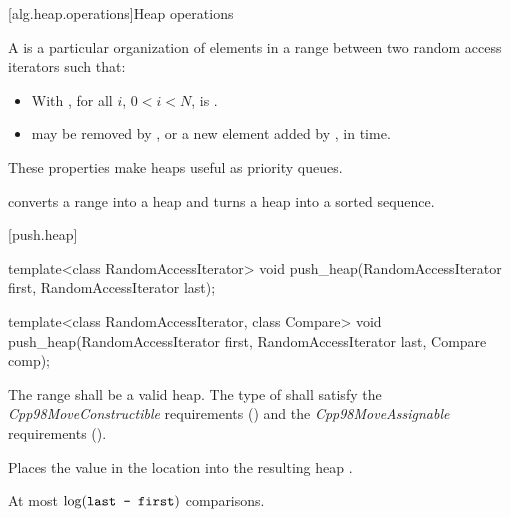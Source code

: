 [alg.heap.operations]{Heap operations}

\pnum
A
is a particular organization of elements in a range between two random access iterators
 such that:

\begin{itemize}
\item With , for all $i$, $0 < i < N$,
is .
\item {}
may be removed by
,
or a new element added by
,
in
time.
\end{itemize}

\pnum
These properties make heaps useful as priority queues.

\pnum
{}
converts a range into a heap and
turns a heap into a sorted sequence.

[push.heap]{}

%
\begin{itemdecl}
template<class RandomAccessIterator>
  void push_heap(RandomAccessIterator first, RandomAccessIterator last);

template<class RandomAccessIterator, class Compare>
  void push_heap(RandomAccessIterator first, RandomAccessIterator last,
                 Compare comp);
\end{itemdecl}

\begin{itemdescr}
\pnum
\requires
The range
shall be a valid heap.
The type of  shall satisfy
the \textit{Cpp98MoveConstructible} requirements
() and the
\textit{Cpp98MoveAssignable} requirements
().

\pnum
\effects
Places the value in the location
into the resulting heap
.

\pnum
\complexity
At most
$\log(\texttt{last - first})$
comparisons.
\end{itemdescr}

